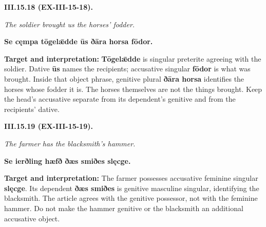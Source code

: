 \par\begin{minipage}{\linewidth}\raggedright
\textbf{III.15.18 (EX-III-15-18).}

\emph{The soldier brought us the horses’ fodder.}

\textbf{Se cęmpa tōgelǣdde ūs ðāra horsa fōdor.}

\textbf{Target and interpretation:} \textbf{Tōgelǣdde} is singular preterite agreeing with the soldier. Dative \textbf{ūs} names the recipients; accusative singular \textbf{fōdor} is what was brought. Inside that object phrase, genitive plural \textbf{ðāra horsa} identifies the horses whose fodder it is. The horses themselves are not the things brought. Keep the head's accusative separate from its dependent's genitive and from the recipients' dative.

\end{minipage}\par\addvspace{4pt}

\par\begin{minipage}{\linewidth}\raggedright
\textbf{III.15.19 (EX-III-15-19).}

\emph{The farmer has the blacksmith’s hammer.}

\textbf{Se ierðling hæfð ðæs smiðes slęcge.}

\textbf{Target and interpretation:} The farmer possesses accusative feminine singular \textbf{slęcge}. Its dependent \textbf{ðæs smiðes} is genitive masculine singular, identifying the blacksmith. The article agrees with the genitive possessor, not with the feminine hammer. Do not make the hammer genitive or the blacksmith an additional accusative object.

\end{minipage}\par\addvspace{4pt}

